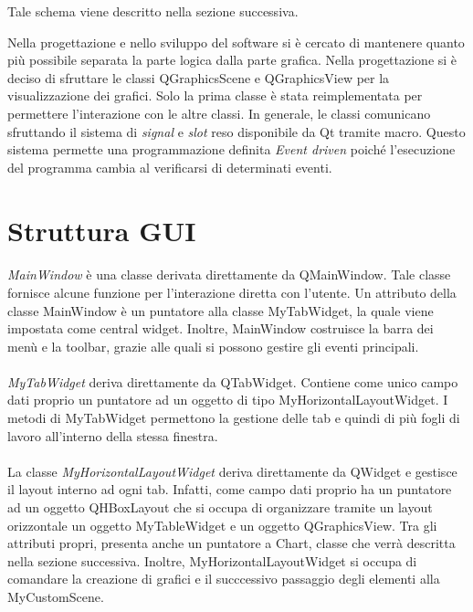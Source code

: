\documentclass[a4paper,10pt]{article}
\begin{document}
Tale schema viene descritto nella sezione successiva.

Nella progettazione e nello sviluppo del software si è cercato di mantenere quanto più possibile separata la parte logica dalla parte grafica. Nella progettazione si è deciso di sfruttare le classi QGraphicsScene e QGraphicsView per la visualizzazione dei grafici. Solo la prima classe è stata reimplementata per permettere l'interazione con le altre classi. In generale, le classi comunicano sfruttando il sistema di \emph{signal} e \emph{slot} reso disponibile da Qt tramite macro. Questo sistema permette una programmazione definita \emph{Event driven} poiché l'esecuzione del programma cambia al verificarsi di determinati eventi.

\section{Struttura GUI}
\paragraph{}
\emph{MainWindow} è una classe derivata direttamente da QMainWindow. Tale classe fornisce alcune funzione per l'interazione diretta con l'utente. Un attributo della classe MainWindow è un puntatore alla classe MyTabWidget, la quale viene impostata come central widget. Inoltre, MainWindow costruisce la barra dei menù e la toolbar, grazie alle quali si possono gestire gli eventi principali.

\paragraph{}
\emph{MyTabWidget} deriva direttamente da QTabWidget. Contiene come unico campo dati proprio un puntatore ad un oggetto di tipo MyHorizontalLayoutWidget. I metodi di MyTabWidget permettono la gestione delle tab e quindi di più fogli di lavoro all'interno della stessa finestra.

\paragraph{}
La classe \emph{MyHorizontalLayoutWidget} deriva direttamente da QWidget e gestisce il layout interno ad ogni tab. Infatti, come campo dati proprio ha un puntatore ad un oggetto QHBoxLayout che si occupa di organizzare tramite un layout orizzontale un oggetto MyTableWidget e un oggetto QGraphicsView. Tra gli attributi propri, presenta anche un puntatore a Chart, classe che verrà descritta nella sezione successiva. Inoltre, MyHorizontalLayoutWidget si occupa di comandare la creazione di grafici e il succcessivo passaggio degli elementi alla MyCustomScene.
\end{document}
